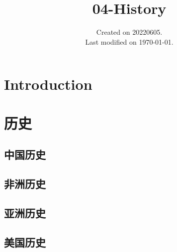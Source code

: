 \documentclass[UTF8]{../RepresentationUniverse}
\begin{document}
\title{04-History}
\date{Created on 20220605.\\   Last modified on \today.}
\maketitle
\tableofcontents


\chapter{Introduction}

\chapter{历史}

\section{中国历史}

\section{非洲历史}
\section{亚洲历史}
\section{美国历史}
\end{document}
